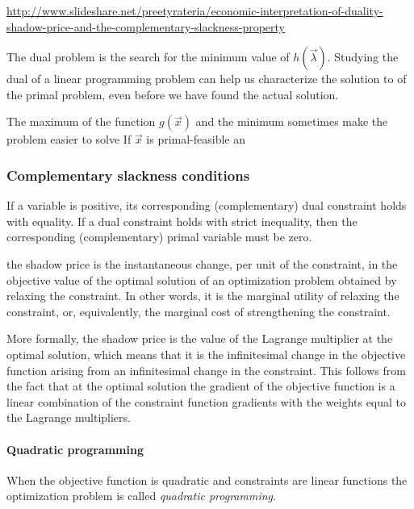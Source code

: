 \documentclass[11pt,oneside]{article}
\begin{document}
			\url{http://www.slideshare.net/preetyrateria/economic-interpretation-of-duality-shadow-price-and-the-complementary-slackness-property}
			
			The dual problem is the search for the minimum value of $h(\vec{\lambda})$.
			Studying the dual of a linear programming problem can help us characterize the 
			solution to of the primal problem, even before we have found the actual solution.
			
			The maximum of the function $g(\vec{x})$ and the minimum 
			sometimes make the problem easier to solve
			If $\vec{x}$ is primal-feasible an
	
	
	
		\subsubsection{Complementary slackness conditions}		

			If a variable is positive, its corresponding (complementary) dual constraint holds with equality.
			If a dual constraint holds with strict inequality, then the corresponding (complementary) primal variable must be zero.
			
			
			the shadow price is the instantaneous change, per unit of the constraint, in the objective value of the optimal solution of an optimization problem obtained by relaxing the constraint. In other words, it is the marginal utility of relaxing the constraint, or, equivalently, the marginal cost of strengthening the constraint.
					
					
			More formally, the shadow price is the value of the Lagrange multiplier at the optimal solution, which means that it is the infinitesimal change in the objective function arising from an infinitesimal change in the constraint. This follows from the fact that at the optimal solution the gradient of the objective function is a linear combination of the constraint function gradients with the weights equal to the Lagrange multipliers. 
				
					 

	\paragraph{Quadratic programming}
	
		When the objective function is quadratic and constraints are linear functions
		the optimization problem is called \emph{quadratic programming}.
\end{document}
